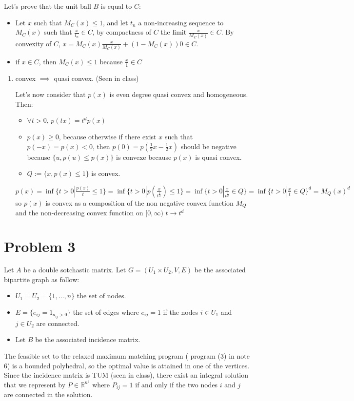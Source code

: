 \documentclass[11pt]{article}
\begin{document}
Let's prove that the unit ball \(B\) is equal to \(C\): 
\begin{itemize}
\item Let \(x\) such that \(M_C(x) \le 1\), and let \(t_n\) a non-increasing sequence to \(M_C(x)\) such that \(\frac{x}{t_n} \in C\), by compactness of \(C\) the limit \(\frac{x}{M_C(x)} \in C\). By convexity of \(C\), \(x = M_C(x) \frac{x}{M_C(x)} + (1-M_C(x)) 0 \in C\).
\item if \(x \in C\), then \(M_C(x) \le 1\) because \(\frac x1 \in C\)
\end{itemize}
\begin{enumerate}
\item convex \(\implies\) quasi convex. (Seen in class)

Let's now consider that \(p(x)\) is even degree quasi convex and homogeneous. Then:
\begin{itemize}
\item \(\forall t > 0\), \(p(t x) = t^d p(x)\)
\item \(p(x) \ge 0\), because otherwise if there exist \(x\) such that \(p(-x) = p(x) < 0\), then \(p(0) = p(\frac12 x - \frac12 x)\) should be negative because \(\{u, p(u) \le p(x)\}\) is convexe because \(p(x)\) is quasi convex.
\item \(Q := \{ x, p(x) \le 1 \}\) is convex.
\end{itemize}
\(p(x) = \inf\{ t > 0 | \frac{p(x)}{t} \le 1\} = \inf\{ t > 0 | p(\frac{x}{t^{\frac1d}}) \le 1\} = \inf\{ t > 0 | \frac{x}{t^{\frac1d}} \in Q\} = \inf\{ t > 0 | \frac{x}{t} \in Q\}^d = M_Q(x)^d\)
so \(p(x)\) is convex as a composition of the non negative convex function \(M_Q\) and the non-decreasing convex function on \([0, \infty)\) \(t \rightarrow t^d\)
\end{enumerate}

\section{Problem 3}
\label{sec:orgheadline3}
Let \(A\) be a double sotchastic matrix. Let \(G = (U_1\times U_2, V, E)\) be the associated bipartite graph as follow:
\begin{itemize}
\item \(U_1 = U_2 = \{1, \ldots, n\}\) the set of nodes.
\item \(E = \{e_{ij} = 1_{a_{ij} > 0}\}\) the set of edges where \(e_{ij} = 1\) if the nodes \(i \in U_1\) and \(j \in U_2\) are connected.
\item Let \(B\) be the associated incidence matrix.
\end{itemize}
The feasible set to the relaxed maximum matching program ( program (3) in note 6) is a bounded polyhedral, so the optimal value is attained in one of the vertices. Since the incidence matrix is TUM (seen in class), there exist an integral solution that we represent by \(P \in \mathbb R^{n^2}\) where \(P_{ij} = 1\) if and only if the two nodes \(i\) and \(j\) are connected in the solution.
\end{document}
